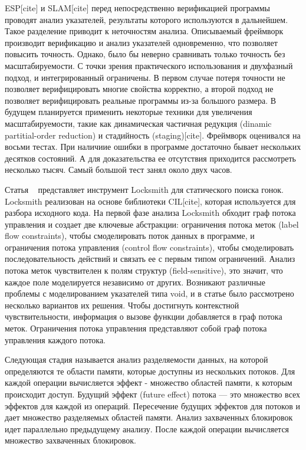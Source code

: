 ESP[cite] и SLAM[cite] перед непосредственно верификацией программы проводят анализ указателей, результаты которого используются в дальнейшем. Такое разделение приводит к неточностям анализа. Описываемый фреймворк производит верификацию и анализ указателей одновременно, что позволяет повысить точность.
Однако, было бы неверно сравнивать только точность без масштабируемости.
С точки зрения практического использования и двухфазный подход, и интегрированный ограничены.
В первом случае потеря точности не позволяет верифицировать многие свойства корректно, а второй подход не позволяет верифицировать реальные программы из-за большого размера.
В будущем планируется применить некоторые техники для увеличения масштабируемости, такие как динамическая частичная редукция (dinamic partitial-order reduction) и стадийность (staging)[cite]. 
Фреймворк оценивался на восьми тестах. При наличиие ошибки в программе достаточно бывает нескольких десятков состояний. А для доказательства ее отсутствия приходится рассмотреть несколько тысяч. Самый большой тест занял около двух часов.

Статья ~\cite{Pratikakis:2011} представляет инструмент Locksmith для статического поиска гонок.
Locksmith реализован на основе библиотеки CIL[cite], которая используется для разбора исходного кода.
На первой фазе анализа Locksmith обходит граф потока управления и создает две ключевые абстракции: ограничения потока меток (label flow constraints), чтобы смоделировать поток данных в программе, и ограничения потока управления (control flow constraints), чтобы смоделировать последовательность действий и связать ее с первым типом ограничений.
Анализ потока меток чувствителен к полям структур (field-sensitive), это значит, что каждое поле моделируется независимо от других.
Возникают различные проблемы с моделированием указателей типа void, и в статье было рассмотрено несколько вариантов их решения.
Чтобы достигнуть контекстной чувствительности, информация о вызове функции добавляется в граф потока меток.
Ограничения потока управления представляют собой граф потока управления каждого потока.

Следующая стадия называется анализ разделяемости данных, на которой определяются те области памяти, которые доступны из нескольких потоков.
Для каждой операции вычисляется эффект - множество областей памяти, к которым происходит доступ.
Будущий эффект (future effect) потока — это множество всех эффектов для каждой из операций.
Пересечение будущих эффектов для потоков и дает множество разделяемых областей памяти.
Анализ захваченных блокировок идет параллельно предыдущему анализу. После каждой операции вычисляется множество захваченных блокировок.

